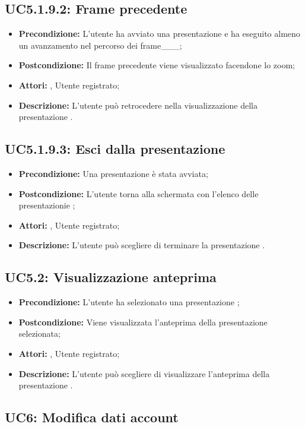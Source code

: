 \subsection{ UC5.1.9.2: Frame precedente}

\begin{itemize}
	\item \textbf{Precondizione:} L'utente ha avviato una presentazione e ha eseguito almeno un avanzamento nel percorso dei frame___;
	\item \textbf{Postcondizione:} Il frame precedente viene visualizzato facendone lo zoom;
	\item \textbf{Attori:} , Utente registrato;
	\item \textbf{Descrizione:} L'utente può retrocedere nella visualizzazione della presentazione .
\end{itemize}
\subsection{ UC5.1.9.3: Esci dalla presentazione }

\begin{itemize}
	\item \textbf{Precondizione:} Una presentazione è stata avviata;
	\item \textbf{Postcondizione:} L'utente torna alla schermata con l'elenco delle presentazionie ;
	\item \textbf{Attori:} , Utente registrato;
	\item \textbf{Descrizione:} L'utente può scegliere di terminare la presentazione .
\end{itemize}
\subsection{ UC5.2: Visualizzazione anteprima }

\begin{itemize}
	\item \textbf{Precondizione:} L'utente ha selezionato una presentazione ;
	\item \textbf{Postcondizione:} Viene visualizzata l'anteprima della presentazione selezionata;
	\item \textbf{Attori:} , Utente registrato;
	\item \textbf{Descrizione:} L'utente può scegliere di visualizzare l'anteprima della presentazione .
\end{itemize}
\subsection{ UC6: Modifica dati account}

